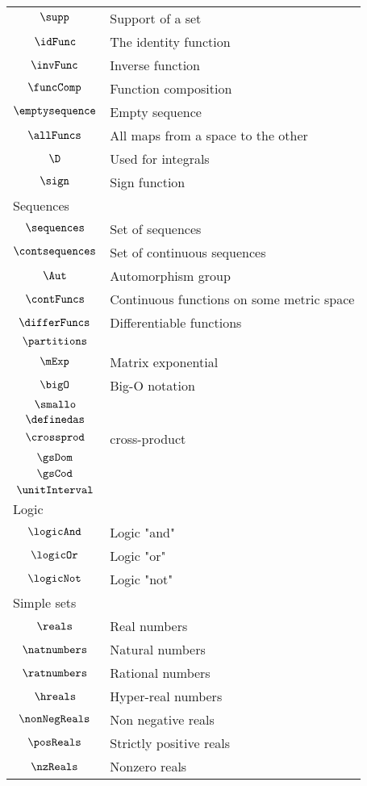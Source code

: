 \begin{longtable}{cl}
 $\supp$ &  Support of a set\\ 
 $\idFunc$ &  The identity function\\ 
 $\invFunc$ &  Inverse function \\ 
 $\funcComp$ &  Function composition\\ 
 $\emptysequence$ &  Empty sequence\\ 
 $\allFuncs$ &  All maps from a space to the other\\ 
 $\D$ &  Used for integrals\\ 
 $\sign$ &  Sign function\\ 
 \multicolumn{2}{l}{Sequences}\\ 
 \hline
$\sequences$ &  Set of sequences\\ 
 $\contsequences$ &  Set of continuous sequences\\ 
 $\Aut$ &  Automorphism group\\ 
 $\contFuncs$ &  Continuous functions on some metric space \\ 
 $\differFuncs$ &  Differentiable functions\\ 
 $\partitions$ & \\ 
 $\mExp$ &  Matrix exponential\\ 
 $\bigO$ &  Big-O notation\\ 
 $\smallo$ & \\ 
 $\definedas$ & \\ 
 $\crossprod$ &  cross-product\\ 
 $\gsDom$ &  \\ 
 $\gsCod$ &  \\ 
 $\unitInterval$ & \\ 
 \multicolumn{2}{l}{Logic}\\ 
 \hline
$\logicAnd$ &  Logic "and"\\ 
 $\logicOr$ &  Logic "or"\\ 
 $\logicNot$ &  Logic "not"\\ 
 \multicolumn{2}{l}{Simple sets}\\ 
 \hline
$\reals$ &  Real numbers\\ 
 $\natnumbers$ &  Natural numbers\\ 
 $\ratnumbers$ &  Rational numbers\\ 
 $\hreals$ &  Hyper-real numbers\\ 
 $\nonNegReals$ &  Non negative reals \\ 
 $\posReals$ &  Strictly positive reals\\ 
 $\nzReals$ &  Nonzero reals\\ 

\end{longtable}
